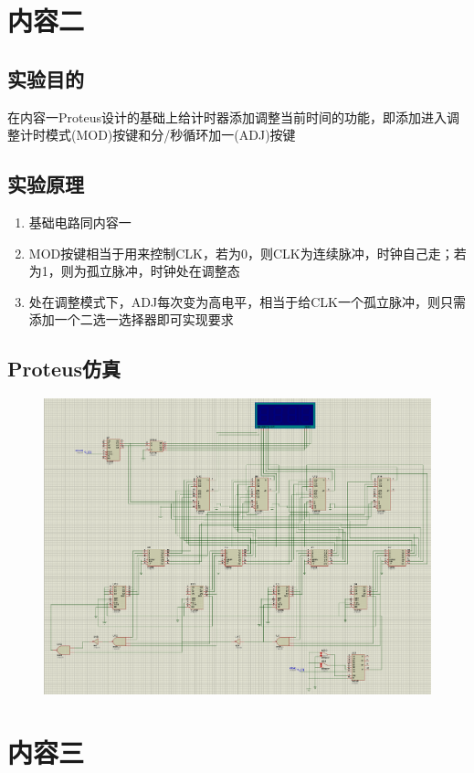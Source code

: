 \documentclass[11pt,UTF8]{ctexart}
\begin{document}
\section{内容二}
\subsection{实验目的}
在内容一Proteus设计的基础上给计时器添加调整当前时间的功能，即添加进入调整计时模式(MOD)按键和分/秒循环加一(ADJ)按键

\subsection{实验原理}
\begin{enumerate}
    \item 基础电路同内容一
    \item MOD按键相当于用来控制CLK，若为0，则CLK为连续脉冲，时钟自己走；若为1，则为孤立脉冲，时钟处在调整态
    \item 处在调整模式下，ADJ每次变为高电平，相当于给CLK一个孤立脉冲，则只需添加一个二选一选择器即可实现要求
\end{enumerate}

\subsection{Proteus仿真}
\begin{figure}[H]
    \centering
    \includegraphics[width=\linewidth]{fig/Counter_2.PNG}
\end{figure}


\section{内容三}
\end{document}
